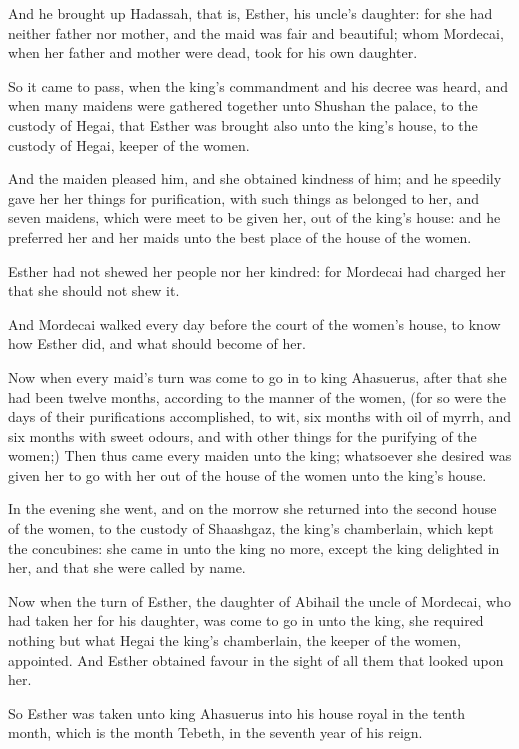 \verse And he brought up Hadassah, that is, Esther, his uncle's daughter: for she had neither father nor mother, and the maid was fair and beautiful; whom Mordecai, when her father and mother were dead, took for his own daughter.

\verse So it came to pass, when the king's commandment and his decree was heard, and when many maidens were gathered together unto Shushan the palace, to the custody of Hegai, that Esther was brought also unto the king's house, to the custody of Hegai, keeper of the women.

\verse And the maiden pleased him, and she obtained kindness of him; and he speedily gave her her things for purification, with such things as belonged to her, and seven maidens, which were meet to be given her, out of the king's house: and he preferred her and her maids unto the best place of the house of the women.

\verse Esther had not shewed her people nor her kindred: for Mordecai had charged her that she should not shew it.

\verse And Mordecai walked every day before the court of the women's house, to know how Esther did, and what should become of her.

\verse Now when every maid's turn was come to go in to king Ahasuerus, after that she had been twelve months, according to the manner of the women, (for so were the days of their purifications accomplished, to wit, six months with oil of myrrh, and six months with sweet odours, and with other things for the purifying of the women;) \verse Then thus came every maiden unto the king; whatsoever she desired was given her to go with her out of the house of the women unto the king's house.

\verse In the evening she went, and on the morrow she returned into the second house of the women, to the custody of Shaashgaz, the king's chamberlain, which kept the concubines: she came in unto the king no more, except the king delighted in her, and that she were called by name.

\verse Now when the turn of Esther, the daughter of Abihail the uncle of Mordecai, who had taken her for his daughter, was come to go in unto the king, she required nothing but what Hegai the king's chamberlain, the keeper of the women, appointed. And Esther obtained favour in the sight of all them that looked upon her.

\verse So Esther was taken unto king Ahasuerus into his house royal in the tenth month, which is the month Tebeth, in the seventh year of his reign.

